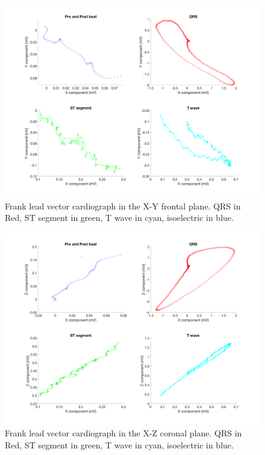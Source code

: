 \documentclass[12pt]{article}
\begin{document}
\begin{figure}[H]
	
	\centering
	\includegraphics[width = .95\textwidth]{Figures/FrankLeads_xy.png}
	\caption{Frank lead vector cardiograph in the X-Y frontal plane. QRS in Red, ST segment in green, T wave in cyan, isoelectric in blue. }
	\label{fig:Frank_xy}
\end{figure}

\begin{figure}[H]
	
	\centering
	\includegraphics[width = .95\textwidth]{Figures/FrankLeads_xz.png}
	\caption{ Frank lead vector cardiograph in the X-Z coronal plane. QRS in Red, ST segment in green, T wave in cyan, isoelectric in blue.}
	\label{fig:Frank_xz}
\end{figure}
\end{document}
